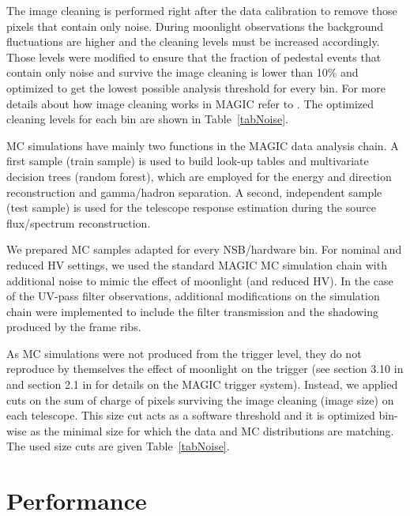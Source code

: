 \documentclass{PoS}
\begin{document}
The image cleaning is performed right after the data calibration to remove those pixels that contain only noise. During moonlight observations the background fluctuations are higher and the cleaning levels must be increased accordingly. Those levels were modified to ensure that the fraction of pedestal events that contain only noise and survive the image cleaning is lower than 10\% and optimized to get the lowest possible analysis threshold for every bin. For more details about how image cleaning works in MAGIC refer to \cite{upgrade2}. The optimized cleaning levels for each bin are shown in Table~\ref{tabNoise}.

MC simulations have mainly two functions in the MAGIC data analysis chain. A first sample (train sample) is used to build look-up tables and multivariate decision trees (random forest), which are employed for the energy and direction reconstruction and gamma/hadron separation. A second, independent sample (test sample) is used for the telescope response estimation during the source flux/spectrum reconstruction. 

We prepared MC samples adapted for every NSB/hardware bin. For nominal and reduced HV settings, we used the standard MAGIC MC simulation chain with additional noise to mimic the effect of moonlight (and reduced HV). %
In the case of the UV-pass filter observations, additional modifications on the simulation chain were implemented to include the filter transmission and the shadowing produced by the frame ribs.

As MC simulations were not produced from the trigger level, they do not reproduce by themselves the effect of moonlight on the trigger (see section 3.10 in \cite{upgrade1} and section 2.1 in \cite{MAGIC_moon} for details on the MAGIC trigger system). Instead, we applied cuts on the sum of charge of pixels surviving the image cleaning (image size) on each telescope. This size cut acts as a software threshold and it is optimized bin-wise as the minimal size for which the data and MC distributions are matching.
The used size cuts are given Table~\ref{tabNoise}.

\section{Performance}
\end{document}
